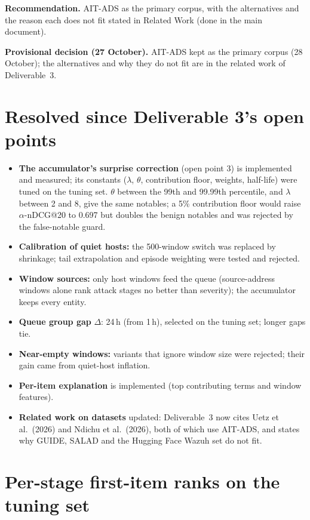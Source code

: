 \documentclass[10.5pt,a4paper]{article}
\newcommand{\rec}[1]{\par\smallskip\noindent\colorbox{gray!12}{\parbox{\dimexpr\linewidth-2\fboxsep}{\textbf{Recommendation.} #1}}\par\smallskip}
\newcommand{\dec}[1]{\par\smallskip\noindent\colorbox{blue!8}{\parbox{\dimexpr\linewidth-2\fboxsep}{\textbf{Provisional decision (27 October).} #1}}\par\medskip}
\begin{document}
\rec{AIT-ADS as the primary corpus, with the alternatives and the reason each does not fit stated in Related Work (done in the main document).}

\dec{AIT-ADS kept as the primary corpus (28 October); the alternatives and why they do not fit are in the related work of Deliverable~3.}

\section{Resolved since Deliverable 3's open points}
\label{sec:resolved}

\begin{itemize}
\item \textbf{The accumulator's surprise correction} (open point 3) is implemented and measured; its constants ($\lambda$, $\theta$, contribution floor, weights, half-life) were tuned on the tuning set. $\theta$ between the 99th and 99.99th percentile, and $\lambda$ between 2 and 8, give the same notables; a 5\% contribution floor would raise $\alpha$-nDCG@20 to 0.697 but doubles the benign notables and was rejected by the false-notable guard.
\item \textbf{Calibration of quiet hosts:} the 500-window switch was replaced by shrinkage; tail extrapolation and episode weighting were tested and rejected.
\item \textbf{Window sources:} only host windows feed the queue (source-address windows alone rank attack stages no better than severity); the accumulator keeps every entity.
\item \textbf{Queue group gap} $\Delta$: 24\,h (from 1\,h), selected on the tuning set; longer gaps tie.
\item \textbf{Near-empty windows:} variants that ignore window size were rejected; their gain came from quiet-host inflation.
\item \textbf{Per-item explanation} is implemented (top contributing terms and window features).
\item \textbf{Related work on datasets} updated: Deliverable~3 now cites Uetz et al.\ (2026) and Ndichu et al.\ (2026), both of which use AIT-ADS, and states why GUIDE, SALAD and the Hugging Face Wazuh set do not fit.
\end{itemize}

\appendix
\section{Per-stage first-item ranks on the tuning set}
\end{document}
